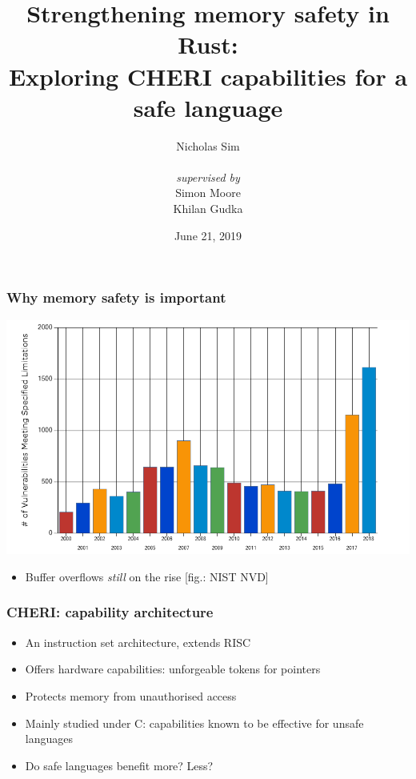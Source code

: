 \documentclass{beamer}
\begin{document}
\title{Strengthening memory safety in Rust:\\
Exploring CHERI capabilities for a safe language}
\author{Nicholas Sim\\~\\
\small \emph{supervised by}\\
Simon Moore\\Khilan Gudka}
\date{June 21, 2019}

\frame{\titlepage}


\begin{frame}
\frametitle{Why memory safety is important}

\includegraphics[width=\textwidth]{graph-overflow.png}
\begin{itemize}
    \item Buffer overflows \emph{still} on the rise [fig.: NIST NVD]
\end{itemize}
\end{frame}


\begin{frame}
\frametitle{CHERI: capability architecture}

\begin{itemize}
    \item An instruction set architecture, extends RISC
    \item Offers hardware capabilities: unforgeable tokens for pointers
    \item Protects memory from unauthorised access
    \item Mainly studied under C: capabilities known to be effective for
    unsafe languages
    \item Do safe languages benefit more? Less?
\end{itemize}
\end{frame}
\end{document}
